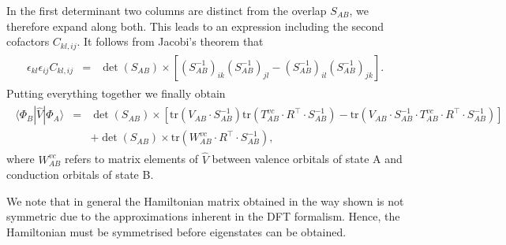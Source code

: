 \documentclass[letterpaper,10pt,english]{sphinxmanual}
\begin{document}
In the first determinant two columns are distinct from the overlap
\(S_{AB}\), we therefore expand along both. This leads to an
expression including the second cofactors \(C_{kl,ij}\). It follows
from Jacobi’s theorem that
\begin{equation*}
\begin{split}\begin{aligned}
\epsilon_{kl}\epsilon_{ij}C_{kl,ij} & = & \det\left(S_{AB}\right)\times\left[\left(S_{AB}^{-1}\right)_{ik}\left(S_{AB}^{-1}\right)_{jl}-\left(S_{AB}^{-1}\right)_{il}\left(S_{AB}^{-1}\right)_{jk}\right].\end{aligned}\end{split}
\end{equation*}
Putting everything together we finally obtain
\begin{equation*}
\begin{split}\begin{aligned}
\langle\Phi_{B}|\hat{V}|\Phi_{A}\rangle & = & \det\left(S_{AB}\right)\times\left[\text{tr}\left(V_{AB}\cdot S_{AB}^{-1}\right)\text{tr}\left(T_{AB}^{vc}\cdot R^{\top}\cdot S_{AB}^{-1}\right)-\text{tr}\left(V_{AB}\cdot S_{AB}^{-1}\cdot T_{AB}^{vc}\cdot R^{\top}\cdot S_{AB}^{-1}\right)\right]\nonumber \\
 &  & +\det\left(S_{AB}\right)\times\text{tr}\left(W_{AB}^{vc}\cdot R^{\top}\cdot S_{AB}^{-1}\right),\end{aligned}\end{split}
\end{equation*}
where \(W_{AB}^{vc}\) refers to matrix elements of \(\hat{V}\)
between valence orbitals of state A and conduction orbitals of state B.

We note that in general the Hamiltonian matrix obtained in the way shown
is not symmetric due to the approximations inherent in the DFT
formalism. Hence, the Hamiltonian must be symmetrised before eigenstates
can be obtained.
\end{document}
